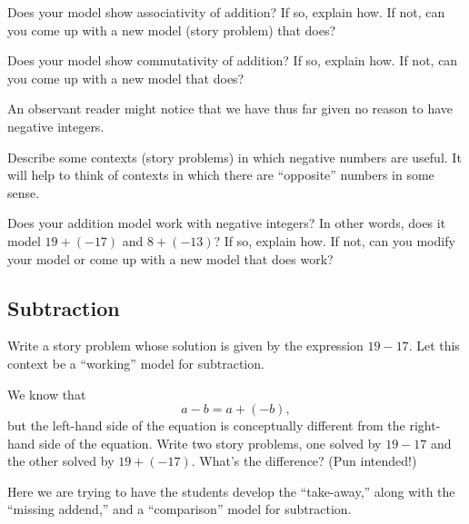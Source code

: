 \begin{question}
Does your model show associativity of addition? If so, explain how. If
not, can you come up with a new model (story problem) that does?
\end{question}
\QM

\begin{question}
Does your model show commutativity of addition? If so, explain how. If
not, can you come up with a new model that does?
\end{question}
\QM

An observant reader might notice that we have thus far given no reason to have 
negative integers.  

\begin{question}
Describe some contexts (story problems) in which negative numbers are useful.  
It will help to think of contexts in which there are ``opposite'' numbers in some sense.  
\end{question}
\QM

\begin{question}
Does your addition model work with negative integers?  In other words, does it model 
$19+ (-17)$ and $8 + (-13)$?  If so, explain how. If not, can you modify your model or 
come up with a new model that does work?
\end{question}
\QM

\subsection{Subtraction}
\begin{question}
Write a story problem whose solution is given by the expression
$19-17$. Let this context be a ``working'' model for subtraction.  
\end{question}
\QM

\begin{question}
We know that 
\[
a - b  = a + (-b),
\]
but the left-hand side of the equation is conceptually
different from the right-hand side of the equation. Write two story
problems, one solved by $19-17$ and the other solved by
$19+(-17)$. What's the difference? (Pun intended!)
\end{question}
\QM

\begin{teachingnote}
Here we are trying to have the students develop the ``take-away,''
along with the ``missing addend,'' and a ``comparison'' model for
subtraction.
\end{teachingnote}


